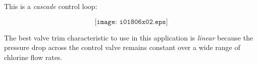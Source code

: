 












This is a {\it cascade} control loop:

$$\texttt{[image: i01806x02.eps]}$$

The best valve trim characteristic to use in this application is {\it linear} because the pressure drop across the control valve remains constant over a wide range of chlorine flow rates.




